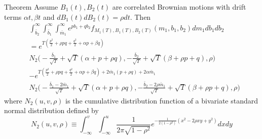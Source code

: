 \documentclass[pdf]{beamer}
\begin{document}
\small
\begin{frame}[allowframebreaks]{Theorem}
Assume $B_{1}(t), B_{2}(t)$ are correlated Brownian motions with drift terms $\alpha t, \beta t$ and $d B_{1}(t) d B_{2}(t)= \rho dt$. Then
\small
\[
\begin{aligned}
&\int_{\bar{b}_{2}}^{\infty} \int_{\bar{b}_{1}}^{\infty} \int_{\bar{m}_{1}}^{\infty} e^{p b_{1}+q b_{2}} f_{M_{1}(T), B_{1}(T), B_{2}(T)}(m_{1}, b_{1}, b_{2}) d m_{1} d b_{1} d b_{2} \\
&=e^{T(\frac{p^{2}}{2}+\rho p q+\frac{q^{2}}{2}+\alpha p+\beta q)}\\
&N_{2}\bigg(-\frac{\bar{b}_{1}}{\sqrt{T}}+\sqrt{T}(\alpha+p+\rho q),-\frac{\bar{b}_{2}}{\sqrt{T}}+\sqrt{T}(\beta+\rho p+q), \rho\bigg) \\
&-e^{T(\frac{p^{2}}{2}+\rho p q+\frac{q^{2}}{2}+\alpha p+\beta q)+2 \bar{m}_{1}(p+\rho q)+2 \alpha \bar{m}_{1}}\\
& N_{2}\bigg(-\frac{\bar{b}_{1}-2 \bar{m}_{1}}{\sqrt{T}}+\sqrt{T}(\alpha+p+\rho q),-\frac{\bar{b}_{2}-2 \rho \bar{m}_{1}}{\sqrt{T}}+\sqrt{T}(\beta+\rho p+q), \rho \bigg)
\end{aligned}
\]
where $N_{2}(u, v, \rho)$ is the cumulative distribution function of a bivariate standard normal distribution defined by
$$
N_{2}(u, v, \rho) \equiv \int_{-\infty}^{v} \int_{-\infty}^{u} \frac{1}{2 \pi \sqrt{1-\rho^{2}}} e^{-\frac{1}{2(1-\rho^{2})}(x^{2}-2 \rho x y+y^{2})} d x d y
$$
\end{frame}
\end{document}
